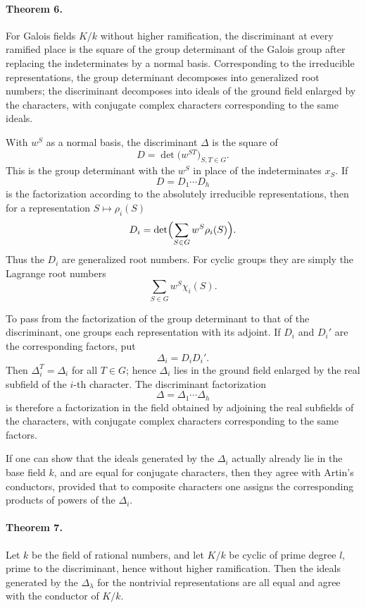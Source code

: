 \documentclass[11pt]{article}
\begin{document}
\paragraph{Theorem 6.}
For Galois fields \(K/k\) without higher ramification, the discriminant at every ramified place is the square of the group determinant of the Galois group after replacing the indeterminates by a normal basis. Corresponding to the irreducible representations, the group determinant decomposes into generalized root numbers; the discriminant decomposes into ideals of the ground field enlarged by the characters, with conjugate complex characters corresponding to the same ideals.

With \(w^S\) as a normal basis, the discriminant \(\Delta\) is the square of
\[
        D=\det\bigl(w^{ST}\bigr)_{S,T\in G}.
\]
This is the group determinant with the \(w^S\) in place of the indeterminates \(x_S\). If
\[
        D=D_1\cdots D_h
\]
is the factorization according to the absolutely irreducible representations, then for a representation \(S\mapsto \rho_i(S)\)
\[
        D_i=\det\Bigl(\sum_{S\in G} w^S\rho_i(S)\Bigr).
\]
Thus the \(D_i\) are generalized root numbers. For cyclic groups they are simply the Lagrange root numbers
\[
        \sum_{S\in G} w^S\chi_i(S).
\]

To pass from the factorization of the group determinant to that of the discriminant, one groups each representation with its adjoint. If \(D_i\) and \(D_i'\) are the corresponding factors, put
\[
        \Delta_i=D_iD_i'.
\]
Then \(\Delta_i^T=\Delta_i\) for all \(T\in G\); hence \(\Delta_i\) lies in the ground field enlarged by the real subfield of the \(i\)-th character. The discriminant factorization
\[
        \Delta=\Delta_1\cdots\Delta_h
\]
is therefore a factorization in the field obtained by adjoining the real subfields of the characters, with conjugate complex characters corresponding to the same factors.

If one can show that the ideals generated by the \(\Delta_i\) actually already lie in the base field \(k\), and are equal for conjugate characters, then they agree with Artin's conductors, provided that to composite characters one assigns the corresponding products of powers of the \(\Delta_i\).

\paragraph{Theorem 7.}
Let \(k\) be the field of rational numbers, and let \(K/k\) be cyclic of prime degree \(l\), prime to the discriminant, hence without higher ramification. Then the ideals generated by the \(\Delta_\lambda\) for the nontrivial representations are all equal and agree with the conductor of \(K/k\).
\end{document}
